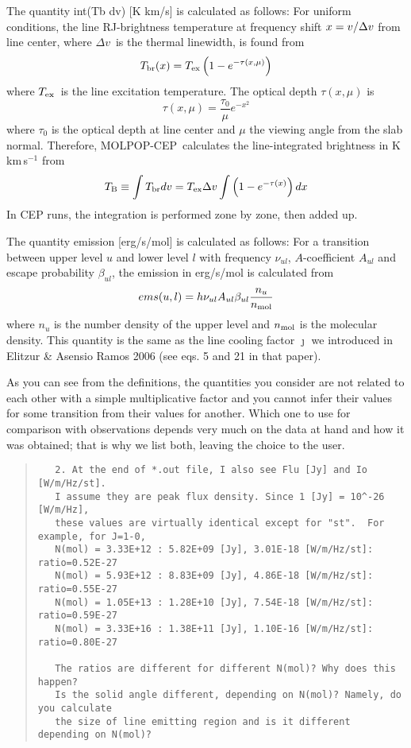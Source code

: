 \documentclass[12pt]{article}
\def\eq#1{\begin{equation} {#1} \end{equation}}
\def\M{MOLPOP-CEP}
\def\Dv       {\hbox{$\Delta v$}}
\def\Tbr      {\hbox{$T_{\rm br}$}}
\def\Tx       {\hbox{$T_{\rm ex}$}}
\def\TB       {\hbox{$T_{\rm B}$}}
\begin{document}
The quantity int(Tb dv) [K km/s] is calculated as follows: For uniform
conditions, the line RJ-brightness temperature at frequency shift $x = v/\Dv$
from line center, where \Dv\ is the thermal linewidth, is found from
\eq{
    \Tbr(x) = \Tx\left(1 - e^{-\tau(x,\mu)}\right)
}
where \Tx\ is the line excitation temperature. The optical depth $\tau(x,\mu)$
is
\eq{
   \tau(x,\mu) = \frac{\tau_0}{\mu}e^{-x^2}
}
where $\tau_0$ is the optical depth at line center and $\mu$ the viewing angle
from the slab normal. Therefore, \M\ calculates the line-integrated brightness
in K\,km\,s$^{-1}$ from
\eq{
  \TB \equiv \int \Tbr dv = \Tx\Dv\int \left(1 - e^{-\tau(x)}\right)dx
}
In CEP runs, the integration is performed zone by zone, then added up.

The quantity emission [erg/s/mol] is calculated as follows: For a transition
between upper level $u$ and lower level $l$ with frequency $\nu_{ul}$,
$A$-coefficient $A_{ul}$ and escape probability $\beta_{ul}$, the emission in
erg/s/mol is calculated from
\eq{\label{eq:ems}
    ems(u,l) = h\nu_{ul}A_{ul}\beta_{ul}\frac{n_u}{n_{\rm mol}}
}
where $n_u$ is the number density of the upper level and $n_{\rm mol}$ is the
molecular density. This quantity is the same as the line cooling factor
$\jmath$ we introduced in Elitzur \& Asensio Ramos 2006 (see eqs. 5 and 21 in
that paper).

As you can see from the definitions, the quantities you consider are not
related to each other with a simple multiplicative factor and you cannot infer
their values for some transition from their values for another. Which one to
use for comparison with observations depends very much on the data at hand and
how it was obtained; that is why we list both, leaving the choice to the user.

\begin{quote}
  \begin{verbatim}
   2. At the end of *.out file, I also see Flu [Jy] and Io [W/m/Hz/st].
   I assume they are peak flux density. Since 1 [Jy] = 10^-26 [W/m/Hz],
   these values are virtually identical except for "st".  For example, for J=1-0,
   N(mol) = 3.33E+12 : 5.82E+09 [Jy], 3.01E-18 [W/m/Hz/st]: ratio=0.52E-27
   N(mol) = 5.93E+12 : 8.83E+09 [Jy], 4.86E-18 [W/m/Hz/st]: ratio=0.55E-27
   N(mol) = 1.05E+13 : 1.28E+10 [Jy], 7.54E-18 [W/m/Hz/st]: ratio=0.59E-27
   N(mol) = 3.33E+16 : 1.38E+11 [Jy], 1.10E-16 [W/m/Hz/st]: ratio=0.80E-27

   The ratios are different for different N(mol)? Why does this happen?
   Is the solid angle different, depending on N(mol)? Namely, do you calculate
   the size of line emitting region and is it different depending on N(mol)?
  \end{verbatim}
\end{quote}
\end{document}
